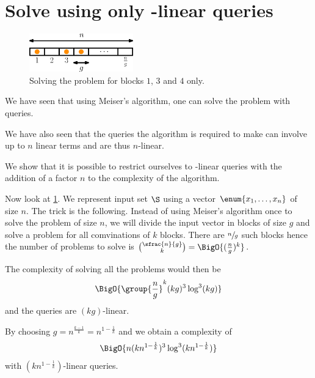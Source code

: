 \section{Solve \kSUM using only -linear queries}


\begin{figure}
\centering
\includegraphics[width=0.4\textwidth]{fig/point-location/blocks}
\caption{Solving the problem for blocks \(1\), \(3\) and \(4\) only.}
\label{fig:point-location:on:blocks}
\end{figure}

We have seen that using Meiser's algorithm, one can solve the \kSUM problem
with  queries.

We have also seen that the queries the algorithm is required to make can
involve up to \(n\) linear terms and are thus \(n\)-linear.

We show that it is possible to restrict ourselves to -linear queries
with the addition of a factor \(n\) to the complexity of the algorithm.

Now look at \ref{fig:point-location:on:blocks}. We represent input set \(\S\)
using a vector \(\enum{x_1,\ldots,x_n}\) of size \(n\). The trick is the
following. Instead of using Meiser's algorithm once to solve the problem of
size \(n\), we will divide the input vector in blocks of size \(g\) and solve a
\kSUM problem for all comvinations of \(k\) blocks.  There are \(\sfrac{n}{g}\)
such blocks hence the number of problems to solve is \(\binom{\sfrac{n}{g}}{k}
= \BigO{(\frac{n}{g})^k} \).

The complexity of solving all the problems would then be
\begin{displaymath}
\BigO{\group{\frac{n}{g}}^k (kg)^3 \log^3 (kg) }
\end{displaymath}
and the queries are \((kg)\)-linear.

By choosing \(g = n^{\frac{k-1}{k}} = n^{1-\frac{1}{k}}\) and we obtain a
complexity of
\begin{displaymath}
\BigO{n (kn^{1-\frac{1}{k}})^3 \log^3 (kn^{1-\frac{1}{k}}) }
\end{displaymath}
with \((kn^{1-\frac{1}{k}})\)-linear queries.


